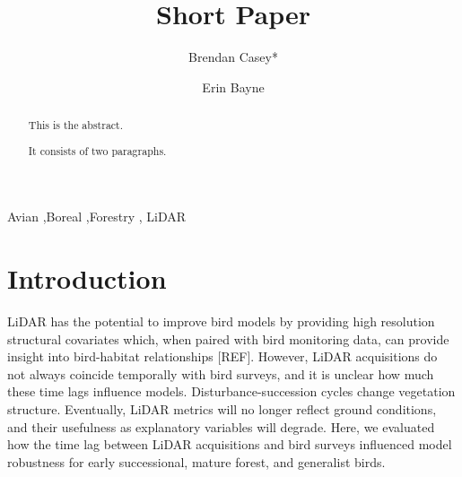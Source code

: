 \documentclass[manuscript, 3p,
authoryear]{elsarticle} %
\begin{document}
\begin{frontmatter}

  \title{Short Paper}
    \author[University of Alberta]{Brendan Casey*%
  }
    \author[University of Alberta]{Erin Bayne}
  
  \begin{abstract}
  This is the abstract.

  It consists of two paragraphs.
  \end{abstract}
    \begin{keyword}
    Avian \sep Boreal \sep Forestry \sep 
    LiDAR
  \end{keyword}
  
 \end{frontmatter}

\hypertarget{introduction}{%
\section{Introduction}\label{introduction}}

LiDAR has the potential to improve bird models by providing high
resolution structural covariates which, when paired with bird monitoring
data, can provide insight into bird-habitat relationships {[}REF{]}.
However, LiDAR acquisitions do not always coincide temporally with bird
surveys, and it is unclear how much these time lags influence models.
Disturbance-succession cycles change vegetation structure. Eventually,
LiDAR metrics will no longer reflect ground conditions, and their
usefulness as explanatory variables will degrade. Here, we evaluated how
the time lag between LiDAR acquisitions and bird surveys influenced
model robustness for early successional, mature forest, and generalist
birds.
\end{document}
